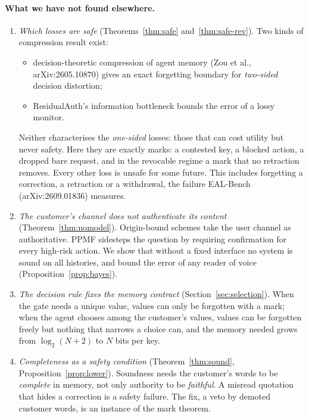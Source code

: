 \paragraph{What we have not found elsewhere.}
\begin{enumerate}
\item \emph{Which losses are safe} (Theorems~\ref{thm:safe} and~\ref{thm:safe-rev}). Two kinds of
  compression result exist:
  \begin{itemize}
  \item decision-theoretic compression of agent memory (Zou et al., arXiv:2605.10870) gives an
    exact forgetting boundary for \emph{two-sided} decision distortion;
  \item ResidualAuth's information bottleneck bounds the error of a lossy monitor.
  \end{itemize}
  Neither characterises the \emph{one-sided} losses: those that can cost utility but never
  safety. Here they are exactly marks: a contested key, a blocked action, a dropped bare
  request, and in the revocable regime a mark that no retraction removes. Every other loss is
  unsafe for some future. This includes forgetting a correction, a retraction or a withdrawal,
  the failure EAL-Bench (arXiv:2609.01836) measures.
\item \emph{The customer's channel does not authenticate its content}
  (Theorem~\ref{thm:nomodel}). Origin-bound schemes take the user channel as authoritative. PPMF
  sidesteps the question by requiring confirmation for every high-risk action. We show that
  without a fixed interface no system is sound on all histories, and bound the error of any
  reader of voice (Proposition~\ref{prop:bayes}).
\item \emph{The decision rule fixes the memory contract} (Section~\ref{sec:selection}). When
  the gate needs a unique value, values can only be forgotten with a mark; when the agent chooses
  among the customer's values, values can be forgotten freely but nothing that narrows a choice
  can, and the memory needed grows from $\log_2(N+2)$ to $N$ bits per key.
\item \emph{Completeness as a safety condition} (Theorem~\ref{thm:sound},
  Proposition~\ref{prop:lower}). Soundness needs the customer's words to be \emph{complete} in
  memory, not only authority to be \emph{faithful}. A misread quotation that hides a correction is
  a safety failure. The fix, a veto by demoted customer words, is an instance of the mark theorem.
\end{enumerate}
